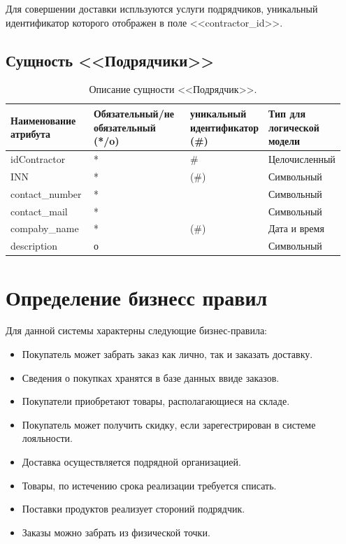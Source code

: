 \documentclass[14pt]{extreport}
\begin{document}
        Для совершении доставки испльзуются услуги подрядчиков, уникальный идентификатор которого отображен в поле <<contractor\_id>>.

    \subsection*{Сущность <<Подрядчики>>}

        \begin{table}[H]
            \begin{tabular}{|p{0.25\linewidth}|p{0.3\linewidth}|p{0.2\linewidth}|p{0.2\linewidth}|}
                \hline
                Наименование атрибута & Обязательный/не обязательный (*/o) & уникальный идентификатор (\#) & Тип для логической модели
                \\ \hline
                idContractor & * & \# & Целочисленный \\ \hline
                INN & * & (\#) & Символьный \\ \hline
                contact\_number & * &  & Символьный\\ \hline
                contact\_mail & * & & Символьный \\ \hline
                compaby\_name & * & (\#) & Дата и время \\ \hline
                description & о & & Символьный \\ \hline
            \end{tabular}
            \caption{Описание сущности <<Подрядчик>>.}
        \end{table}
    
    \section{Определение бизнесс правил}

    Для данной системы характерны следующие бизнес-правила:
    \begin{itemize}
        \item Покупатель может забрать заказ как лично, так и заказать доставку.
        \item Сведения о покупках хранятся в базе данных ввиде заказов.
        \item Покупатели приобретают товары, располагающиеся на складе.
        \item Покупатель может получить скидку, если зарегестрирован в системе лояльности.
        \item Доставка осуществляется подрядной организацией.
        \item Товары, по истечению срока реализации требуется списать.
        \item Поставки продуктов реализует стороний подрядчик.
        \item Заказы можно забрать из физической точки.
    \end{itemize}
    
\end{document}
